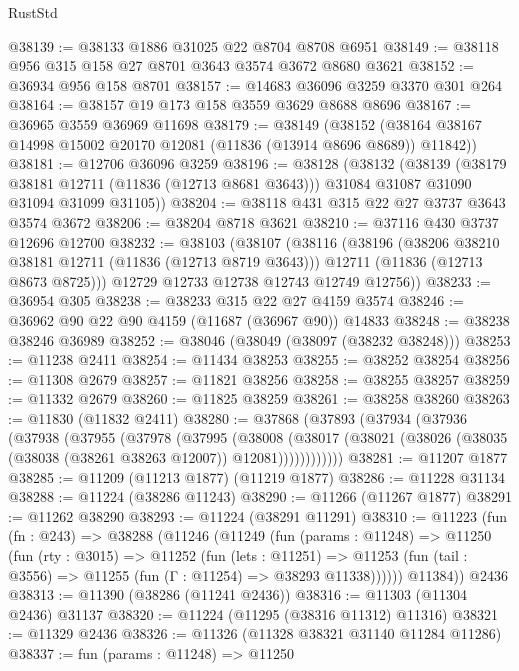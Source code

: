 \begin{lexlean}{RustStd}
\begin{coremodule}
@38139 := @38133 @1886 @31025 @22 @8704 @8708 @6951
@38149 := @38118 @956 @315 @158 @27 @8701 @3643 @3574 @3672 @8680 @3621
@38152 := @36934 @956 @158 @8701
@38157 := @14683 @36096 @3259 @3370 @301 @264
@38164 := @38157 @19 @173 @158 @3559 @3629 @8688 @8696
@38167 := @36965 @3559 @36969 @11698
@38179 := @38149
    (@38152 (@38164 @38167 @14998 @15002 @20170 @12081 (@11836 (@13914 @8696 @8689)) @11842))
@38181 := @12706 @36096 @3259
@38196 := @38128
    (@38132
      (@38139
        (@38179 @38181 @12711 (@11836 (@12713 @8681 @3643)))
        @31084
        @31087
        @31090
        @31094
        @31099
        @31105))
@38204 := @38118 @431 @315 @22 @27 @3737 @3643 @3574 @3672
@38206 := @38204 @8718 @3621
@38210 := @37116 @430 @3737 @12696 @12700
@38232 := @38103
    (@38107
      (@38116
        (@38196
          (@38206 @38210 @38181 @12711 (@11836 (@12713 @8719 @3643)))
          @12711
          (@11836 (@12713 @8673 @8725)))
        @12729
        @12733
        @12738
        @12743
        @12749
        @12756))
@38233 := @36954 @305
@38238 := @38233 @315 @22 @27 @4159 @3574
@38246 := @36962 @90 @22 @90 @4159 (@11687 (@36967 @90)) @14833
@38248 := @38238 @38246 @36989
@38252 := @38046 (@38049 (@38097 (@38232 @38248)))
@38253 := @11238 @2411
@38254 := @11434 @38253
@38255 := @38252 @38254
@38256 := @11308 @2679
@38257 := @11821 @38256
@38258 := @38255 @38257
@38259 := @11332 @2679
@38260 := @11825 @38259
@38261 := @38258 @38260
@38263 := @11830 (@11832 @2411)
@38280 := @37868
    (@37893
      (@37934
        (@37936
          (@37938
            (@37955
              (@37978
                (@37995
                  (@38008
                    (@38017
                      (@38021 (@38026 (@38035 (@38038 (@38261 @38263 @12007)) @12081))))))))))))
@38281 := @11207 @1877
@38285 := @11209 (@11213 @1877) (@11219 @1877)
@38286 := @11228 @31134
@38288 := @11224 (@38286 @11243)
@38290 := @11266 (@11267 @1877)
@38291 := @11262 @38290
@38293 := @11224 (@38291 @11291)
@38310 := @11223
    (fun (fn : @243) =>
    @38288
      (@11246
        (@11249
          (fun (params : @11248) =>
          @11250
            (fun (rty : @3015) =>
            @11252
              (fun (lets : @11251) =>
              @11253 (fun (tail : @3556) => @11255 (fun (Γ : @11254) => @38293 @11338))))))
        @11384))
    @2436
@38313 := @11390 (@38286 (@11241 @2436))
@38316 := @11303 (@11304 @2436) @31137
@38320 := @11224 (@11295 (@38316 @11312) @11316)
@38321 := @11329 @2436
@38326 := @11326 (@11328 @38321 @31140 @11284 @11286)
@38337 := fun (params : @11248) =>
  @11250

\end{coremodule}
\end{lexlean}
